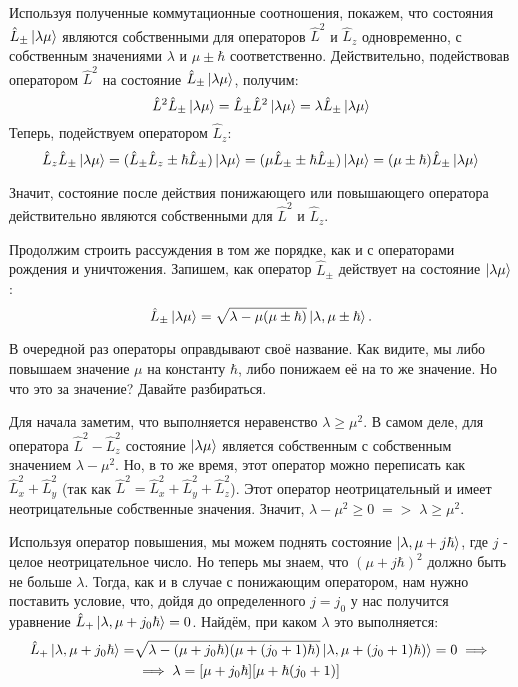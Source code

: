 Используя полученные коммутационные соотношения, покажем, что состояния $\hat{L}_{\pm}\ket{\lambda\mu}$ являются собственными для операторов $\hat{L}^2$ и $\hat{L}_z$ одновременно, с собственным значениями $\lambda$ и $\mu \pm \hbar$ соответственно. Действительно, подействовав оператором $\hat{L}^2$ на состояние $\hat{L}_{\pm}\ket{\lambda\mu}$, получим:
\[
\hat{L}^2\hat{L}_{\pm}\ket{\lambda\mu} = \hat{L}_{\pm}\hat{L}^2\ket{\lambda\mu} = \lambda\hat{L}_{\pm}\ket{\lambda\mu}
\]
Теперь, подействуем оператором $\hat{L}_z$:
\[
\hat{L}_z\hat{L}_{\pm}\ket{\lambda\mu} = (\hat{L}_{\pm}\hat{L}_z \pm \hbar\hat{L}_{\pm})\ket{\lambda\mu} = (\mu\hat{L}_{\pm} \pm \hbar\hat{L}_{\pm})\ket{\lambda\mu} = (\mu \pm \hbar)\hat{L}_{\pm}\ket{\lambda\mu}
\]

Значит, состояние после действия понижающего или повышающего оператора действительно являются собственными для $\hat{L}^2$ и $\hat{L}_z$.

Продолжим строить рассуждения в том же порядке, как и с операторами рождения и уничтожения. Запишем, как оператор $\hat{L}_{\pm}$ действует  на состояние $\ket{\lambda\mu}$:
\[
\hat{L}_{\pm}\ket{\lambda\mu} = \sqrt{\lambda - \mu(\mu \pm \hbar)}\ket{\lambda,\mu\pm\hbar}.
\]

В очередной раз операторы оправдывают своё название. Как видите, мы либо повышаем значение $\mu$ на константу $\hbar$, либо понижаем её на то же значение. Но что это за значение? Давайте разбираться.

Для начала заметим, что выполняется неравенство $\lambda \geq \mu^2$. В самом деле, для оператора $\hat{L}^2 - \hat{L}^2_z$ состояние $\ket{\lambda\mu}$ является собственным с собственным значением $\lambda - \mu^2$. Но, в то же время, этот оператор можно переписать как $\hat{L}^2_x + \hat{L}^2_y$ (так как $\hat{L}^2 = \hat{L}^2_x + \hat{L}^2_y + \hat{L}^2_z$). Этот оператор неотрицательный и имеет неотрицательные собственные значения. Значит, $\lambda - \mu^2 \geq 0\; => \; \lambda \geq \mu^2$.

Используя оператор повышения, мы можем поднять состояние $\ket{\lambda,\mu + j\hbar}$, где $j$ - целое неотрицательное число. Но теперь мы знаем, что $(\mu + j\hbar)^2$ должно быть не больше $\lambda$. Тогда, как и в случае с понижающим оператором, нам нужно поставить условие, что, дойдя до определенного $j = j_0$ у нас получится уравнение $\hat{L}_+\ket{\lambda, \mu + j_0\hbar} = 0$. Найдём, при каком $\lambda$ это выполняется:
\begin{align*}
\hat{L}_{+}\ket{\lambda,\mu + j_0\hbar} = &\sqrt{\lambda - (\mu+j_0\hbar)(\mu + (j_0 + 1)\hbar)}\ket{\lambda,\mu +(j_0 + 1)\hbar)} = 0 \implies \\ 
& \implies  \lambda = [\mu + j_0\hbar][\mu + \hbar(j_0 + 1)]
\end{align*}


